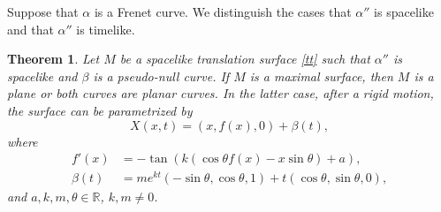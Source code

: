 \documentclass[a4paper,12pt]{amsart}
\numberwithin{equation}{section}
\newtheorem{theorem}{Theorem}[section]
\theoremstyle{definition}
\def\r{\mathbb R}
\def\r{\mathbb R}
\begin{document}
Suppose that $\alpha$ is a Frenet curve. We distinguish the cases that $\alpha''$ is spacelike and that $\alpha''$ is timelike.

\begin{theorem} \label{t31}
 Let $M$ be a spacelike  translation surface \eqref{tt} such that  $\alpha''$  is spacelike and  $\beta$ is a pseudo-null curve. If $M$ is a maximal surface, then $M$ is a plane or both curves are planar curves. In the latter case,   after a rigid motion, the surface can be parametrized by 
\begin{equation}\label{e11}
X(x,t)=(x,f(x),0)+\beta(t),
\end{equation}
where  
\begin{equation}\label{e12}
 \begin{split}
 f'(x)&=-\tan\left(k(\cos\theta f(x)-x\sin\theta)+a\right), \\ 
 \beta(t)&=me^{kt}(-\sin\theta,\cos\theta,1)+t(\cos\theta,\sin\theta,0),
 \end{split}
 \end{equation}
 and $a,k,m,\theta\in\r$, $k,m\not=0$.
   \end{theorem}
\end{document}
